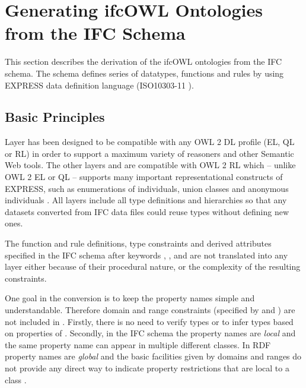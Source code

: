 
\section{Generating ifcOWL Ontologies from the IFC Schema}
\label{sec:ifcOWL}
This section describes the derivation of the ifcOWL ontologies from the IFC schema. The schema defines series of datatypes, functions and rules by using EXPRESS data definition language (ISO10303-11 \cite{schenck1994information}).

\subsection{Basic Principles}

Layer \ifcsimple{} has been designed to be compatible with any OWL 2 DL profile (EL, QL or RL) in order to support a maximum variety of reasoners and other Semantic Web tools. The other layers \standard{} and \extended{} are compatible with OWL 2 RL which -- unlike OWL 2 EL or QL -- supports many important representational constructs of EXPRESS, such as enumerations of individuals, union classes and anonymous individuals \cite{motik2012owl}. All \ifcowl{} layers include all type definitions and hierarchies so that any \ifcrdf{} datasets converted from IFC data files could reuse types without defining new ones.

The function and rule definitions, type constraints and derived attributes specified in the IFC schema after keywords , , and  are not translated into any \ifcowl{} layer either because of their procedural nature, or the complexity of the resulting constraints.

One goal in the conversion is to keep the property names simple and understandable. Therefore domain and range constraints (specified by  and ) are not included in \ifcowl{}. Firstly, there is no need to verify types or to infer types based on properties of \ifcowl{}. Secondly, in the IFC schema the property names are \emph{local} and the same property name can appear in multiple different classes. In RDF property names are \emph{global} and the basic facilities given by domains and ranges do not provide any direct way to indicate property restrictions that are local to a class \cite{world2014rdf}. 

